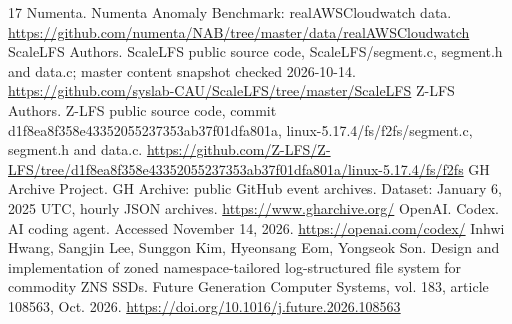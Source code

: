 \begin{thebibliography}{17}
 Numenta. Numenta Anomaly Benchmark: realAWSCloudwatch data. \url{https://github.com/numenta/NAB/tree/master/data/realAWSCloudwatch}
 ScaleLFS Authors. ScaleLFS public source code, ScaleLFS/segment.c, segment.h and data.c; master content snapshot checked 2026-10-14. \url{https://github.com/syslab-CAU/ScaleLFS/tree/master/ScaleLFS}
 Z-LFS Authors. Z-LFS public source code, commit d1f8ea8f358e43352055237353ab37f01dfa801a, linux-5.17.4/fs/f2fs/segment.c, segment.h and data.c. \url{https://github.com/Z-LFS/Z-LFS/tree/d1f8ea8f358e43352055237353ab37f01dfa801a/linux-5.17.4/fs/f2fs}
 GH Archive Project. GH Archive: public GitHub event archives. Dataset: January 6, 2025 UTC, hourly JSON archives. \url{https://www.gharchive.org/}
 OpenAI. Codex. AI coding agent. Accessed November 14, 2026. \url{https://openai.com/codex/}
 Inhwi Hwang, Sangjin Lee, Sunggon Kim, Hyeonsang Eom, Yongseok Son. Design and implementation of zoned namespace-tailored log-structured file system for commodity ZNS SSDs. Future Generation Computer Systems, vol. 183, article 108563, Oct. 2026. \url{https://doi.org/10.1016/j.future.2026.108563}
\end{thebibliography}
